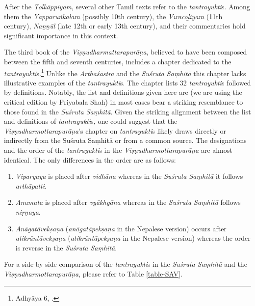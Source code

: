 After the \emph{Tolkāppiyam}, several other Tamil texts refer to the \emph{tantrayukti}s. Among them the \emph{Yāpparuṅkalam} (possibly 10th century), the \emph{Vīracoḻiyam} (11th century), \emph{Naṉṉūl} (late 12th or early 13th century), and their commentaries hold significant importance in this context.

The third book of the \emph{Viṣṇudharmattarapurāṇa}, believed to have been composed between the fifth and seventh centuries, includes a chapter dedicated to the \emph{tantrayukti}s.\footnote{Adhyāya 6, \cite[13--14]{shah-1958}.} Unlike the \emph{Arthaśāstra} and the \emph{Suśruta Saṃhitā} this chapter lacks illustrative examples of the \emph{tantrayukti}s. The chapter lists 32 \emph{tantrayukti}s followed by definitions. Notably, the list and definitions given here are (we are using the critical edition by Priyabala Shah) in most cases bear a striking resemblance to those found in the \emph{Suśruta Saṃhitā}. Given the striking alignment between the list and definitions of \emph{tantrayukti}s, one could suggest that the \emph{Viṣṇudharmottarapurāṇa}'s chapter on \emph{tantrayukti}s likely draws directly or indirectly from the Suśruta Saṃhitā or from a common source. The designations and the order of the \emph{tantrayukti}s in the \emph{Viṣṇudharmottarapurāṇa} are almost identical. The only differences in the order are as follows:

\begin{enumerate}

	\item \emph{Viparyaya} is placed after \emph{vidhāna} whereas in the \emph{Suśruta Saṃhitā} it follows \emph{arthāpatti}.
	
	\item \emph{Anumata} is placed after \emph{vyākhyāna} whereas in the \emph{Suśruta Saṃhitā} follows \emph{niṛṇaya}.

	\item \emph{Anāgatāvekṣaṇa} (\emph{anāgatāpekṣaṇa} in the Nepalese version) occurs after \emph{atikrāntāvekṣaṇa} (\emph{atikrāntāpekṣaṇa} in the Nepalese version) whereas the order is reverse in the \emph{Suśruta Saṃhitā}.
	
\end{enumerate}

For a side-by-side comparison of the \emph{tantrayukti}s in the \emph{Suśruta Saṃhitā} and the \emph{Viṣṇudharmottarapurāṇa}, please refer to Table \ref{table-SAV}.



